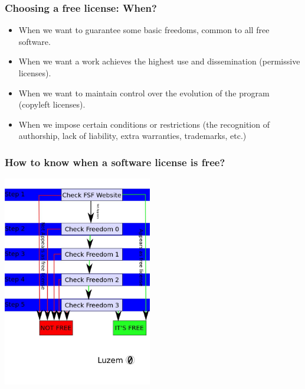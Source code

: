 
\begin{frame}
\frametitle{Choosing a free license: When?}

\begin{itemize}
\item When we want to guarantee some basic freedoms, common to all free software.
\item When we want a work achieves the highest use and dissemination (permissive licenses).
\item When we want to maintain control over the evolution of the program (copyleft licenses).
\item When we impose certain conditions or restrictions (the recognition of authorship, lack of liability, extra warranties, trademarks, etc.)
\end{itemize}

\end{frame}


\begin{frame}
\frametitle{How to know when a software license is free?}

\begin{center}
\includegraphics[width=6.5cm]{figs/chart.jpg}
\end{center}

\end{frame}


